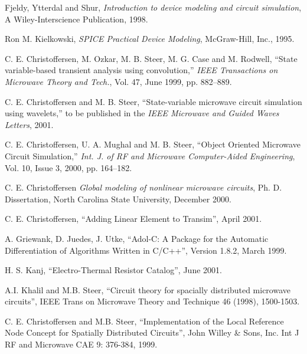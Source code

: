 \begin{thebibliography}{99}
Fjeldy, Ytterdal and Shur, \textit{Introduction to device modeling
and circuit simulation}, A Wiley-Interscience Publication, 1998.

Ron M. Kielkowski, \textit{SPICE Practical Device Modeling},
McGraw-Hill, Inc., 1995.

 C. E. Christoffersen, M. Ozkar, M. B. Steer, M. G. Case
and M. Rodwell, ``State variable-based transient analysis using
convolution,'' \emph{IEEE Transactions on Microwave Theory and
Tech.}, Vol. 47, June 1999, pp. 882--889.

 C. E. Christoffersen and M. B. Steer,
``State-variable microwave circuit simulation using wavelets,'' to
be published in the \emph{IEEE Microwave and Guided Waves
Letters}, 2001.

 C. E. Christoffersen, U. A. Mughal and M. B. Steer,
``Object Oriented Microwave Circuit Simulation,'' \emph{Int. J.
of RF and Microwave Computer-Aided Engineering}, Vol. 10, Issue 3,
2000, pp. 164--182.

 C. E. Christoffersen \emph{Global modeling of nonlinear
microwave circuits}, Ph. D. Dissertation, North Carolina State
University, December 2000.

 C. E. Christoffersen, ``Adding Linear Element to
Transim'', April 2001.

 A. Griewank, D. Juedes, J. Utke, ``Adol-C: A Package for
the Automatic Differentiation of Algorithms Written in C/C++'',
Version 1.8.2, March 1999.

 H. S. Kanj, ``Electro-Thermal Resistor Catalog'', June
2001.

 A.I. Khalil and M.B. Steer, ``Circuit theory for spacially
distributed microwave circuits'', IEEE Trans on Microwave Theory
and Technique 46 (1998), 1500-1503.

 C. E. Christoffersen and M.B. Steer, ``Implementation of the
Local Reference Node Concept for Spatially Distributed Circuits'',
John Willey \& Sons, Inc. Int J RF and Microwave CAE 9: 376-384,
1999.


\end{thebibliography}
